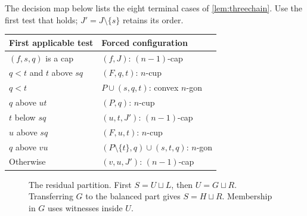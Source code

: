 The decision map below lists the eight terminal cases of
\cref{lem:threechain}. Use the first test that holds;
$J'=J\setminus\{s\}$ retains its order.
\begin{center}
\small
\begin{tabular}{ll}
\toprule
First applicable test & Forced configuration\\
\midrule
$(f,s,q)$ is a cap & $(f,J)$: $(n-1)$-cap\\
$q<t$ and $t$ above $sq$ & $(F,q,t)$: $n$-cup\\
$q<t$ & $P\cup(s,q,t)$: convex $n$-gon\\
$q$ above $ut$ & $(P,q)$: $n$-cup\\
$t$ below $sq$ & $(u,t,J')$: $(n-1)$-cap\\
$u$ above $sq$ & $(F,u,t)$: $n$-cup\\
$q$ above $vu$ & $(P\setminus\{t\},q)\cup(s,t,q)$: $n$-gon\\
Otherwise & $(v,u,J')$: $(n-1)$-cap\\
\bottomrule
\end{tabular}
\end{center}

\begin{figure}[ht]
\centering
{}
\caption{The residual partition. First $S=U\sqcup L$, then
$U=G\sqcup R$. Transferring $G$ to the balanced part gives
$S=H\sqcup R$. Membership in $G$ uses witnesses inside $U$.}
\label{fig:partition}
\end{figure}

